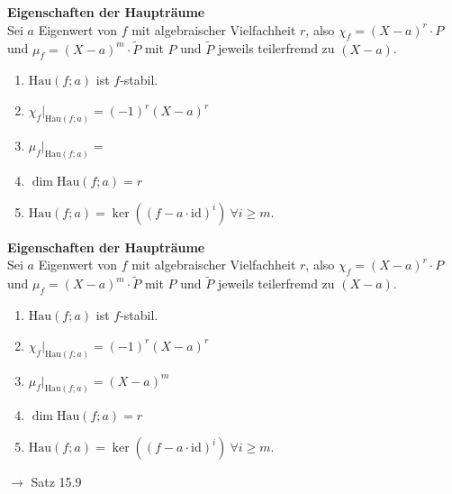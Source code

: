 \documentclass[11pt]{article}
\renewcommand{\cite}[1]{\par\bigskip\hfill{\color{gray}\tiny\(\to\) #1}}
\renewcommand{\geq}{\geqslant}
\newcommand{\id}{\mathrm{id}}
\newenvironment{field}{}{\newpage}
\newif\ifnote
\newenvironment{note}{\notetrue}{\notefalse}
\begin{document}
\begin{note}
    \begin{field}
        \textbf{Eigenschaften der Haupträume}\\
        Sei $a$ Eigenwert von $f$ mit algebraischer Vielfachheit $r$, also $\chi_f = (X-a)^r\cdot P$ und $\mu_f = (X-a)^m\cdot \tilde P$ mit $P$ und $\tilde P$ jeweils teilerfremd zu $(X-a)$.
        \begin{enumerate}[(1)]
            \item $\text{Hau}(f;a)$ ist $f$-stabil.
            \item $\chi_f\vert_{\text{Hau}(f;a)} = (-1)^r(X-a)^r$
            \item $\mu_f\vert_{\text{Hau}(f;a)} = \phantom{(X-a)^m}$
            \item $\dim \text{Hau}(f;a) = r$
            \item $\text{Hau}(f;a)= \ker((f- a\cdot \id)^i) \ \forall i \geq m$.
        \end{enumerate}
    \end{field}
    \begin{field}
        \textbf{Eigenschaften der Haupträume}\\
        Sei $a$ Eigenwert von $f$ mit algebraischer Vielfachheit $r$, also $\chi_f = (X-a)^r\cdot P$ und $\mu_f = (X-a)^m\cdot \tilde P$ mit $P$ und $\tilde P$ jeweils teilerfremd zu $(X-a)$.
        \begin{enumerate}[(1)]
            \item $\text{Hau}(f;a)$ ist $f$-stabil.
            \item $\chi_f\vert_{\text{Hau}(f;a)} = (-1)^r(X-a)^r$
            \item $\mu_f\vert_{\text{Hau}(f;a)} = (X-a)^m$
            \item $\dim \text{Hau}(f;a) = r$
            \item $\text{Hau}(f;a)= \ker((f- a\cdot \id)^i) \ \forall i \geq m$.
        \end{enumerate}
        \cite{Satz 15.9}
    \end{field}


\end{note}
\end{document}

